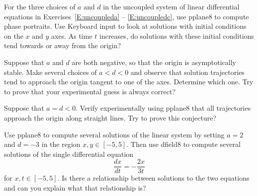 \documentclass{ximera}
\begin{document}
\CEXER


\begin{exercise} \label{c3.4.4}
For the three choices of $a$ and $d$ in the uncoupled system of
linear differential equations in Exercises~\ref{E:uncoupleda} -- 
\ref{E:uncoupledc}, use {\sf pplane8}
to compute phase portraits.  Use {\sf Keyboard input} to look at
solutions with initial conditions on the $x$ and $y$ axes.  As time
$t$ increases, do solutions with these initial conditions tend towards 
or away from the origin?
\end{exercise}

\begin{exercise} \label{c3.4.5}
Suppose that $a$ and $d$ are both negative, so that the origin
is asymptotically stable.  Make several choices of $a<d<0$ and
observe that solution trajectories tend to approach the origin
tangent to one of the axes.  Determine which one.  Try to prove
that your experimental guess is always correct?
\end{exercise}

\begin{exercise} \label{c3.4.6}
Suppose that $a=d<0$.  Verify experimentally using {\sf pplane8}
that all trajectories approach the origin along straight lines.
Try to prove this conjecture?
\end{exercise}

\begin{exercise} \label{c3.4.7}
Use {\sf pplane8} to compute several solutions of the linear system by
setting $a=2$ and $d=-3$ in the region $x,y\in[-5,5]$.  Then use
{\sf dfield8} to compute several solutions of the single differential
equation
\[
\frac{dx}{dt} = -\frac{2x}{3t}
\]
for $x,t\in[-5,5]$.  Is there a relationship between solutions to the
two equations and can you explain what that relationship is?
\end{exercise}
\end{document}
